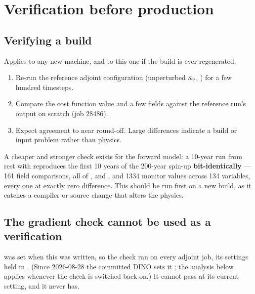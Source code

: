 \section{Verification before production}

\subsection{Verifying a build}
\label{app:verify}

Applies to any new machine, and to this one if the build is ever regenerated.

\begin{enumerate}[nosep]
  \item Re-run the reference adjoint configuration (unperturbed $\kappa_{v}$,
        ) for a few hundred timesteps.
  \item Compare the cost function value and a few  fields against the
        reference run's output on scratch (job 28486).
  \item Expect agreement to near round-off. Large differences indicate a build or
        input problem rather than physics.
\end{enumerate}

A cheaper and stronger check exists for the forward model: a 10-year run from
rest with  reproduces the first 10 years of the 200-year
spin-up \textbf{bit-identically} --- 161  field comparisons, all of
,  and , and 1334 monitor values
across 134 variables, every one at exactly zero difference. This should be run
first on a new build, as it catches a compiler or source change that alters the
physics.

\subsection{The gradient check cannot be used as a verification}
\label{app:grdchk}

 was set when this was written, so the check ran on
every adjoint job, its settings held in . (Since
2026-08-28 the committed DINO  sets it ; the
analysis below applies whenever the check is switched back on.) It cannot pass
at its current setting, and it never has.

